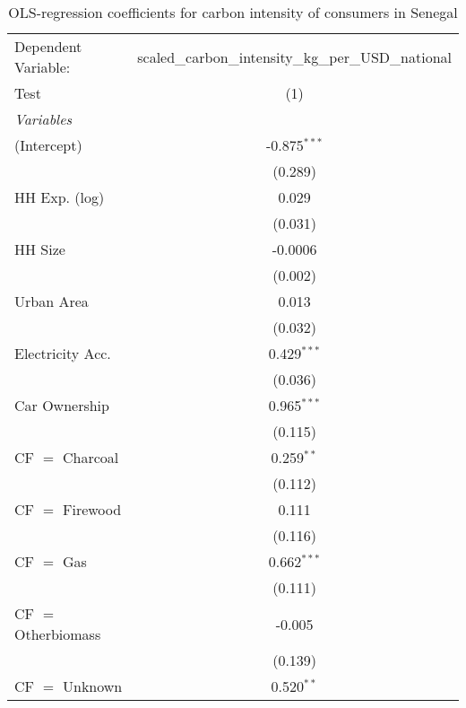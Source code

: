 
\begin{table}[htbp!]
   \centering
   \small
   \begin{adjustbox}{width = 1\textwidth, max height = 0.95\textheight, center}
      \begin{threeparttable}[b]
         \caption{\label{tab:OLS_1_SEN} OLS-regression coefficients for carbon intensity of consumers in Senegal}
         \begin{tabular}{lc}
            \tabularnewline \midrule \midrule
            Dependent Variable: & scaled\_carbon\_intensity\_kg\_per\_USD\_national\\        
            Test                & (1)\\  
            \midrule
            \emph{Variables}\\
            (Intercept)         & -0.875$^{***}$\\   
                                & (0.289)\\   
            HH Exp. (log)       & 0.029\\   
                                & (0.031)\\   
            HH Size             & -0.0006\\   
                                & (0.002)\\   
            Urban Area          & 0.013\\   
                                & (0.032)\\   
            Electricity Acc.    & 0.429$^{***}$\\   
                                & (0.036)\\   
            Car Ownership       & 0.965$^{***}$\\   
                                & (0.115)\\   
            CF $=$ Charcoal     & 0.259$^{**}$\\   
                                & (0.112)\\   
            CF $=$ Firewood     & 0.111\\   
                                & (0.116)\\   
            CF $=$ Gas          & 0.662$^{***}$\\   
                                & (0.111)\\   
            CF $=$ Otherbiomass & -0.005\\   
                                & (0.139)\\   
            CF $=$ Unknown      & 0.520$^{**}$\\   

\end{tabular}
\end{threeparttable}
\end{adjustbox}
\end{table}
